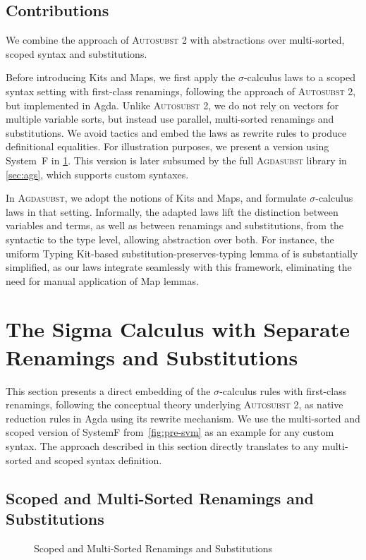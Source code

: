 \documentclass[screen,nonacm]{acmart}
\begin{document}
\subsection{Contributions}
We combine the approach of \textsc{Autosubst 2} with abstractions over
multi-sorted, scoped syntax and substitutions.

Before introducing Kits and Maps, we first apply the $σ$-calculus laws to a
scoped syntax setting with first-class renamings, following the approach of
\textsc{Autosubst 2}, but implemented in Agda. Unlike \textsc{Autosubst 2}, we
do not rely on vectors for multiple variable sorts, but instead use parallel,
multi-sorted renamings and substitutions. We avoid tactics and embed the laws
as rewrite rules to produce definitional equalities. For illustration purposes,
we present a version using System~F in \cref{sec:mis}. This version is later
subsumed by the full \textsc{Agdasubst} library in \cref{sec:ags}, which
supports custom syntaxes.

In \textsc{Agdasubst}, we adopt the notions of Kits and Maps, and formulate
$σ$-calculus laws in that setting. Informally, the adapted laws lift the
distinction between variables and terms, as well as between renamings and
substitutions, from the syntactic to the type level, allowing abstraction over
both. For instance, the uniform Typing Kit-based substitution-preserves-typing
lemma of \citet{saffrich:LIPIcs.ITP.2024.32} is substantially simplified, as
our laws integrate seamlessly with this framework, eliminating the need for
manual application of Map lemmas.

\section{The Sigma Calculus with Separate Renamings and Substitutions}\label{sec:mis}
This section presents a direct embedding of the $σ$-calculus rules with
first-class renamings, following the conceptual theory underlying
\textsc{Autosubst 2}, as native reduction rules in Agda using its rewrite
mechanism. We use the multi-sorted and scoped version of SystemF
from~\cref{fig:pre-svm} as an example for any custom syntax. The approach
described in this section directly translates to any multi-sorted and scoped
syntax definition.

\subsection{Scoped and Multi-Sorted Renamings and Substitutions}\label{sec:mis-sub}
\begin{figure}[t]
      \centering
      \small
      \begin{minipage}[t]{0.48\linewidth}
            \small
            \raggedright{}
            \ERen{}
      \end{minipage}
      \hfill
      \begin{minipage}[t]{0.48\linewidth}
            \small
            \raggedright{}
            \ESub{}
      \end{minipage}
      \caption{Scoped and Multi-Sorted Renamings and Substitutions}\label{fig:mis-ras}
\end{figure}
\end{document}
